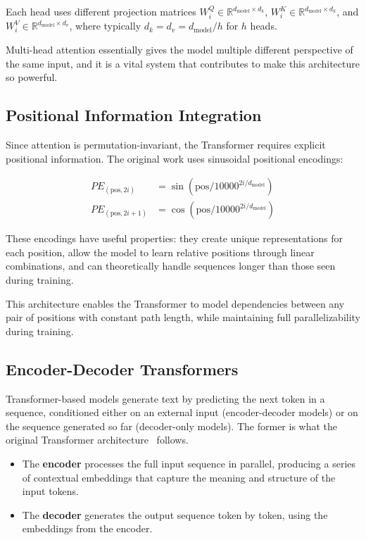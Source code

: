 Each head uses different projection matrices $W_i^Q \in \mathbb{R}^{d_{\text{model}} \times d_k}$, $W_i^K \in \mathbb{R}^{d_{\text{model}} \times d_k}$, and $W_i^V \in \mathbb{R}^{d_{\text{model}} \times d_v}$, where typically $d_k = d_v = d_{\text{model}}/h$ for $h$ heads. 

Multi-head attention essentially gives the model multiple different perspective of the same input, and it is a vital system that contributes to make this architecture so powerful.

\subsection{Positional Information Integration}

Since attention is permutation-invariant, the Transformer requires explicit positional information. The original work uses sinusoidal positional encodings:

\begin{align}
PE_{(\text{pos}, 2i)} &= \sin(\text{pos}/10000^{2i/d_{\text{model}}}) \\
PE_{(\text{pos}, 2i+1)} &= \cos(\text{pos}/10000^{2i/d_{\text{model}}})
\end{align}

These encodings have useful properties: they create unique representations for each position, allow the model to learn relative positions through linear combinations, and can theoretically handle sequences longer than those seen during training.

This architecture enables the Transformer to model dependencies between any pair of positions with constant path length, while maintaining full parallelizability during training.

\subsection{Encoder-Decoder Transformers}

Transformer-based models generate text by predicting the next token in a sequence, conditioned either on an external input (encoder-decoder models) or on the sequence generated so far (decoder-only models). The former is what the original Transformer architecture~\cite{attention_is_all_you_need} follows.

\begin{itemize}
  \item The \textbf{encoder} processes the full input sequence in parallel, producing a series of contextual embeddings that capture the meaning and structure of the input tokens.
  \item The \textbf{decoder} generates the output sequence token by token, using the embeddings from the encoder.
\end{itemize}


